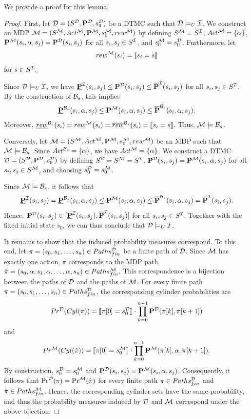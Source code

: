 We provide a proof for this lemma.
\begin{proof}
First, let $\mathcal{D}=(S^{\mathcal{D}},\mathbf{P}^{\mathcal{D}},s_0^{\mathcal{D}})$ be a DTMC such that $\mathcal{D}\models_U\mathcal{I}$. We construct an MDP $\mathcal{M}=(S^{\mathcal{M}},Act^{\mathcal{M}},\mathbf{P}^{\mathcal{M}},s_0^{\mathcal{M}},rew^{\mathcal{M}})$ by defining $S^{\mathcal{M}}=S^{\mathcal{I}}$, $Act^{\mathcal{M}}=\{\alpha\}$, $\mathbf{P}^{\mathcal{M}}(s_i,\alpha,s_j)=\mathbf{P}^{\mathcal{D}}(s_i,s_j)$ for all $s_i,s_j\in S^{\mathcal{I}}$, and $s_0^{\mathcal{M}}=s_0^{\mathcal{D}}$. Furthermore, let 
\[rew^{\mathcal{M}}(s_i)= \llbracket s_i = s \rrbracket\]
for $s\in S^{\mathcal{I}}$.

Since $\mathcal{D}\models_U\mathcal{I}$, we have $\mathbf{\underline{P}}^{\mathcal{I}}(s_i,s_j)\leq\mathbf{P}^{\mathcal{D}}(s_i,s_j)\leq\mathbf{\overline{P}}^{\mathcal{I}}(s_i,s_j)$ for all $s_i,s_j\in S^{\mathcal{I}}$. By the construction of $\mathcal{B}_s$, this implies
\[
\mathbf{\underline{P}}^{\mathcal{B}_s}(s_i,\alpha,s_j)\leq\mathbf{P}^{\mathcal{M}}(s_i,\alpha,s_j)\leq\mathbf{\overline{P}}^{\mathcal{B}_s}(s_i,\alpha,s_j).
\]
Moreover, $\underline{rew}^{\mathcal{B}_s}(s_i)=rew^{\mathcal{M}}(s_i)=\overline{rew}^{\mathcal{B}_s}(s_i)=\llbracket s_i = s \rrbracket$. Thus, $\mathcal{M}\models\mathcal{B}_s$.

Conversely, let $\mathcal{M}=(S^{\mathcal{M}},Act^{\mathcal{M}},\mathbf{P}^{\mathcal{M}},s_0^{\mathcal{M}},rew^{\mathcal{M}})$ be an MDP such that $\mathcal{M}\models\mathcal{B}_s$. Since $Act^{\mathcal{B}_s}=\{\alpha\}$, we have $Act^{\mathcal{M}}=\{\alpha\}$. We construct a DTMC $\mathcal{D}=(S^{\mathcal{D}},\mathbf{P}^{\mathcal{D}},s_0^{\mathcal{D}})$ by defining $S^{\mathcal{D}}=S^{\mathcal{M}}=S^{\mathcal{I}}$, $\mathbf{P}^{\mathcal{D}}(s_i,s_j)=\mathbf{P}^{\mathcal{M}}(s_i,\alpha,s_j)$ for all $s_i,s_j \in S^{\mathcal{M}}$, and choosing $s_0^{\mathcal{D}} = s_0^{\mathcal{M}}$.

Since $\mathcal{M}\models\mathcal{B}_s$, it follows that
\[
\mathbf{\underline{P}}^{\mathcal{I}}(s_i,s_j)=\mathbf{\underline{P}}^{\mathcal{B}_s}(s_i,\alpha,s_j)\leq\mathbf{P}^{\mathcal{M}}(s_i,\alpha,s_j)\leq\mathbf{\overline{P}}^{\mathcal{B}_s}(s_i,\alpha,s_j)=\mathbf{\overline{P}}^{\mathcal{I}}(s_i,s_j).
\]
Hence, $\mathbf{P}^{\mathcal{D}}(s_i,s_j)\in[\mathbf{\underline{P}}^{\mathcal{I}}(s_i,s_j),\mathbf{\overline{P}}^{\mathcal{I}}(s_i,s_j)]$ for all $s_i,s_j\in S^{\mathcal{I}}$. Together with the fixed initial state $s_0$, we can thus conclude that $\mathcal{D}\models_U\mathcal{I}$.

It remains to show that the induced probability measures correspond. To this end, let $\pi=(s_0,s_1,\dots,s_n)\in Paths^{\mathcal{D}}_{fin}$ be a finite path of $\mathcal{D}$. Since $\mathcal{M}$ has exactly one action, $\pi$ corresponds to the MDP path $\hat{\pi}=(s_0,\alpha,s_1,\alpha,\dots,\alpha,s_n) \in Paths^{\mathcal{M}}_{fin}$. This correspondence is a bijection between the paths of $\mathcal{D}$ and the paths of $\mathcal{M}$. For every finite path $\pi = (s_0,s_1,\dots,s_n) \in Paths^{\mathcal{D}}_{fin}$, the corresponding cylinder probabilities are
\[
Pr^{\mathcal{D}}(Cyl(\pi))=\llbracket \pi[0] = s_0^{\mathcal{D}}\rrbracket \cdot \prod_{k=0}^{n-1}\mathbf{P}^{\mathcal{D}}(\pi[k],\pi[k+1])
\]
and
\[
Pr^{\mathcal{M}}(Cyl(\hat{\pi}))=\llbracket \pi[0] = s_0^{\mathcal{M}}\rrbracket \cdot\prod_{k=0}^{n-1}\mathbf{P}^{\mathcal{M}}(\pi[k],\alpha,\pi[k+1]).
\]
By construction, $s_0^{\mathcal{D}} = s_0^{\mathcal{M}}$ and $\mathbf{P}^{\mathcal{D}}(s_i,s_j)=\mathbf{P}^{\mathcal{M}}(s_i,\alpha,s_j)$. Consequently, it follows that $\Pr^{\mathcal{D}}(\pi)=\Pr^{\mathcal{M}}(\hat{\pi})$ for every finite path $\pi\in Paths^{\mathcal{D}}_{fin}$ and $\hat{\pi}\in Paths^{\mathcal{M}}_{fin}$. Hence, the corresponding cylinder sets have the same probability, and thus the probability measures induced by $\mathcal{D}$ and $\mathcal{M}$ correspond under the above bijection.
\end{proof}

